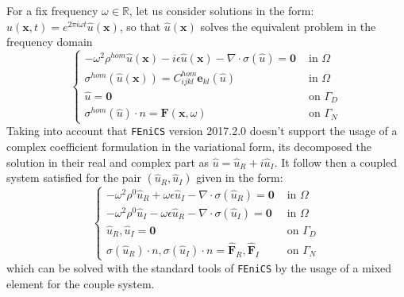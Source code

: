 For a fix frequency $\omega \in \mathbb{R}$, let us consider solutions in the form: $u(\mathbf{x},t) = e^{2 \pi i \omega t}\hat{u}(\mathbf{x})$, so that $\hat{u}(\mathbf{x})$ solves the equivalent problem in the frequency domain
\begin{equation*}
    \left \{
    \begin{array}{cc}
        -\omega^2 \rho^{hom} \hat{u}(\mathbf{x}) - i \epsilon \hat{u}(\mathbf{x}) - \nabla \cdot \sigma(\hat{u}) = \mathbf{0} & \text{ in } \Omega\\
        \sigma^{hom}(\hat{u}(\mathbf{x}))  =  C_{ijkl}^{hom}\mathbf{e}_{kl}(\hat{u}) & \text{ in } \Omega \\
        \hat{u} = \mathbf{0} & \text{ on } \Gamma_D\\
        \sigma^{hom}(\hat{u}) \cdot n = \mathbf{F}(\mathbf{x}, \omega) & \text{ on } \Gamma_N
    \end{array}
    \right .
\end{equation*}
Taking into account that \texttt{FEniCS} version 2017.2.0 doesn't support the usage of a complex coefficient formulation in the variational form, its decomposed the solution in their real and complex part as $\hat{u} = \hat{u}_R + i \hat{u}_I$. It follow then a coupled system satisfied for the pair $(\hat{u}_R, \hat{u}_I)$ given in the form:
\begin{equation*}
    \left \{
    \begin{array}{cc}
        -\omega^2 \rho^0 \hat{u}_R +  \omega \epsilon \hat{u}_I - \nabla \cdot \sigma (\hat{u}_R) = \mathbf{0} & \text{ in } \Omega \\
        -\omega^2 \rho^0 \hat{u}_I - \omega \epsilon \hat{u}_R - \nabla \cdot \sigma (\hat{u}_I) = \mathbf{0} & \text{ in } \Omega \\
        \hat{u}_R, \hat{u}_I = \mathbf{0} & \text{ on } \Gamma_D \\
        \sigma(\hat{u}_R)\cdot n, \sigma(\hat{u}_I)\cdot n = \hat{\mathbf{F}}_R, \hat{\mathbf{F}}_I & \text{ on }\Gamma_N
    \end{array}
    \right.
\end{equation*}
which can be solved with the standard tools of \texttt{FEniCS} by the usage of a mixed element for the couple system.

